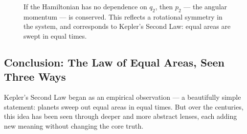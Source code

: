 \begin{figure}[H]
\centering
{}
\caption{If the Hamiltonian has no dependence on \( q_2 \), then \( p_2 \) — the angular momentum — is conserved. This reflects a rotational symmetry in the system, and corresponds to Kepler’s Second Law: equal areas are swept in equal times.}
\end{figure}




\subsection{Conclusion: The Law of Equal Areas, Seen Three Ways}

Kepler’s Second Law began as an empirical observation — a beautifully simple statement: planets sweep out equal areas in equal times. But over the centuries, this idea has been seen through deeper and more abstract lenses, each adding new meaning without changing the core truth.

